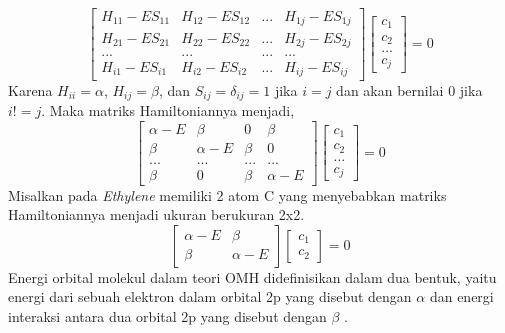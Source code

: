 \documentclass[12pt,a4paper]{report}
\begin{document}
	\begin{equation}
	\begin{bmatrix}
	{H_{11}-ES_{11}} & {H_{12}-ES_{12}} & ... &{H_{1j}-ES_{1j}}\\
	{H_{21}-ES_{21}} & {H_{22}-ES_{22}} & ... &{H_{2j}-ES_{2j}}\\
	... & ... & ... & ... \\
	{H_{i1}-ES_{i1}} & {H_{i2}-ES_{i2}} & ... &{H_{ij}-ES_{ij}}
	\end{bmatrix}
	\begin{bmatrix}c_1 \\ c_2 \\ ... \\ c_j \end{bmatrix} = 0
	\end{equation}
	Karena {$H_{ii} = \alpha$}, {$H_{ij} = \beta$}, dan {$S_{ij} = \delta_{ij} = 1$} jika {$i=j$} dan akan bernilai 0 jika {$i!=j$}. Maka matriks Hamiltoniannya menjadi,
	\begin{equation}
	\begin{bmatrix}
	\label{hamiltonian}
	\alpha - E & \beta & 0 &\beta \\
	\beta & \alpha - E & \beta & 0\\
	... & ... & ... & ... \\
	\beta & 0 & \beta & \alpha - E
	\end{bmatrix}
	\begin{bmatrix}c_1 \\ c_2 \\ ... \\ c_j \end{bmatrix} = 0
	\end{equation}
	Misalkan pada \textit{Ethylene} memiliki 2 atom C yang menyebabkan matriks Hamiltoniannya menjadi ukuran berukuran 2x2.
	\begin{equation}
	\begin{bmatrix}
	\alpha - E & \beta \\
	\beta & \alpha - E
	\end{bmatrix}
	\begin{bmatrix}c_1 \\ c_2 \end{bmatrix} = 0
	\end{equation}
	Energi orbital molekul dalam teori OMH didefinisikan dalam dua bentuk, yaitu energi dari sebuah elektron dalam orbital 2p yang disebut dengan {$\alpha$} dan energi interaksi antara dua orbital 2p yang disebut dengan {$\beta$} \cite{Anil}\cite{Rustaman2008}.
	
\end{document}
